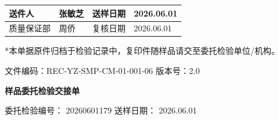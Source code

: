 \documentclass[UTF8,10pt,a4paper,fontset=fandol]{ctexart}
\newcommand{\fieldvalue}[1]{#1}
\newcommand{\handwritten}[1]{#1}
\begin{document}
\vspace{0.4em}

\begin{tabular}{|p{2.8cm}|p{3.0cm}|p{2.0cm}|p{3.1cm}|}
\hline
\centering 送件人 &
\centering
\fieldvalue{\handwritten{张敏芝}}
&
\centering 送样日期 &
\centering
\fieldvalue{\handwritten{2026.06.01}}
\tabularnewline
\hline
\centering 质量保证部 &
\centering
\fieldvalue{\handwritten{周侨}}
&
\centering 复核日期 &
\centering
\fieldvalue{\handwritten{2026.06.01}}
\tabularnewline
\hline
\end{tabular}

\vspace{0.5em}

\scriptsize
*本单据原件归档于检验记录中，复印件随样品请交至委托检验单位/机构。

\newpage


\begin{center}
文件编码：REC-YZ-SMP-CM-01-001-06 \qquad 版本号：2.0

\textbf{\large 样品委托检验交接单}
\end{center}

委托检验编号：
\fieldvalue{20260601179}
\hfill
送样日期：
\fieldvalue{2026.06.01}

\vspace{2mm}
\end{document}
